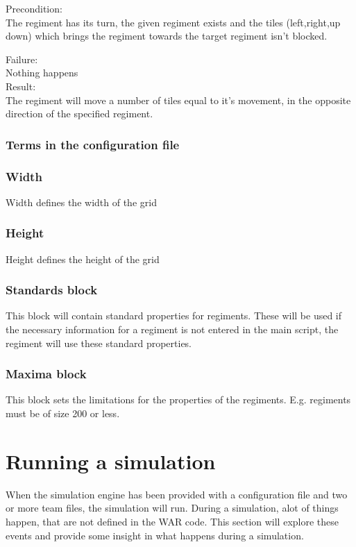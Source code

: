 		Precondition: \\
		The regiment has its turn, the given regiment exists and the tiles (left,right,up down) 
		which brings the regiment towards the target regiment isn't blocked.
		
		Failure: \\
		Nothing happens \\
		
		Result: \\
		The regiment will move a number of tiles equal to it's movement, in the opposite direction of the specified regiment.
				
		\subsubsection{Terms in the configuration file}
		
		\subsubsection{Width}
		Width defines the width of the grid
		
		\subsubsection{Height}
		Height defines the height of the grid
		
		\subsubsection{Standards block}
		This block will contain standard properties for regiments. These will be used if the necessary 
		information for a regiment is not entered in the main script, the regiment will use these standard properties.
		
		\subsubsection{Maxima block}
		This block sets the limitations for the properties of the regiments. E.g. regiments must be of size 200 or less.

\section{ Running a simulation }
	When the simulation engine has been provided with a configuration file and two or more team files, the simulation will run. During a simulation, alot of things happen, that are not defined in the WAR code. This section will explore these events and provide some insight in what happens during a simulation.
